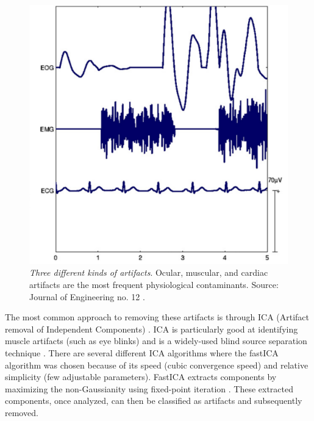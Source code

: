 \begin{figure}[H]
    \centering
\includegraphics[width=0.35\textheight]{images/artifacts_image.png}
    \caption{\textit{Three different kinds of artifacts}. Ocular, muscular, and cardiac artifacts are the most frequent physiological contaminants. Source: Journal of Engineering no. 12 \cite{artifactsImage}.}
    \label{fig:artifacts}
\end{figure}

The most common approach to removing these artifacts is through ICA (Artifact removal of Independent Components) \cite{artifacts}. ICA is particularly good at identifying muscle artifacts (such as eye blinks) and is a widely-used blind source separation technique \cite{ICA}. There are several different ICA algorithms where the fastICA algorithm was chosen because of its speed (cubic convergence speed) and relative simplicity (few adjustable parameters). FastICA extracts components by maximizing the non-Gaussianity using fixed-point iteration \cite{ICA}. These extracted components, once analyzed, can then be classified as artifacts and subsequently removed.

